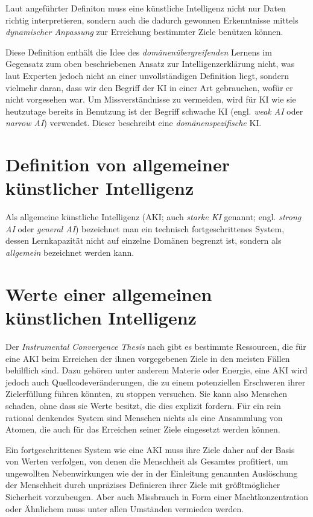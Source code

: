 Laut angeführter Definiton muss eine künstliche Intelligenz nicht nur Daten richtig interpretieren, sondern auch die dadurch gewonnen Erkenntnisse mittels \emph{dynamischer Anpassung} zur Erreichung bestimmter Ziele benützen können.

Diese Definition enthält die Idee des \emph{domänenübergreifenden} Lernens im Gegensatz zum oben beschriebenen Ansatz zur Intelligenzerklärung nicht, was laut Experten jedoch nicht an einer unvollständigen Definition liegt, sondern vielmehr daran, dass wir den Begriff der KI in einer Art gebrauchen, wofür er nicht vorgesehen war. Um Missverständnisse zu vermeiden, wird für KI wie sie heutzutage bereits in Benutzung ist der Begriff schwache KI (engl. \emph{weak AI} oder \emph{narrow AI}) verwendet.  Dieser beschreibt eine \emph{domänenspezifische} KI.

\section{Definition von allgemeiner künstlicher Intelligenz}
Als allgemeine künstliche Intelligenz (AKI; auch \emph{starke KI} genannt; engl. \emph{strong AI} oder \emph{general AI}) bezeichnet man ein technisch fortgeschrittenes System, dessen Lernkapazität nicht auf einzelne Domänen begrenzt ist, sondern als \emph{allgemein} bezeichnet werden kann. 

\section{Werte einer allgemeinen künstlichen Intelligenz}
Der \emph{Instrumental Convergence Thesis} nach gibt es bestimmte Ressourcen, die für eine AKI beim Erreichen der ihnen vorgegebenen Ziele in den meisten Fällen behilflich sind. Dazu gehören unter anderem Materie oder Energie, eine AKI wird jedoch auch Quellcodeveränderungen, die zu einem potenziellen Erschweren ihrer Zielerfüllung führen könnten, zu stoppen versuchen. Sie kann also Menschen schaden, ohne dass sie Werte besitzt, die dies explizit fordern. Für ein rein rational denkendes System sind Menschen nichts als eine Ansammlung von Atomen, die auch für das Erreichen seiner Ziele eingesetzt werden können.

Ein fortgeschrittenes System wie eine AKI muss ihre Ziele daher auf der Basis von Werten verfolgen, von denen die Menschheit als Gesamtes profitiert, um ungewollten Nebenwirkungen wie der in der Einleitung genannten Auslöschung der Menschheit durch unpräzises Definieren ihrer Ziele mit größtmöglicher Sicherheit vorzubeugen. Aber auch Missbrauch in Form einer Machtkonzentration oder Ähnlichem muss unter allen Umständen vermieden werden.

